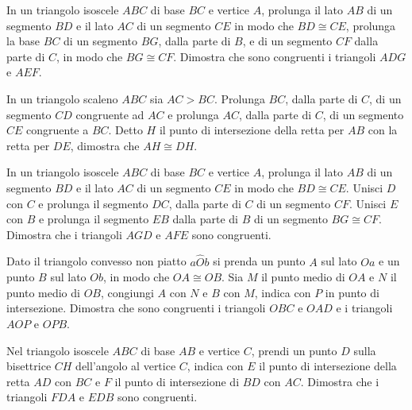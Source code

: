 \begin{multicols}{2}
\begin{esercizio}
\label{ese:2.65}
In un triangolo isoscele \(ABC\) di base \(BC\) e vertice \(A\), prolunga 
il lato \(AB\) di un segmento \(BD\) e il lato \(AC\) di un segmento \(CE\) 
in modo che \(BD\cong CE\), prolunga la base \(BC\) di un segmento \(BG\), 
dalla parte di \(B\), e di un segmento \(CF\) dalla parte di \(C\), in modo 
che \(BG\cong CF\). Dimostra che sono congruenti i triangoli \(ADG\) e 
\(AEF\).
\end{esercizio}

\begin{esercizio}
\label{ese:2.66}
In un triangolo scaleno \(ABC\) sia \(AC>BC\). Prolunga \(BC\), dalla parte 
di \(C\), di un segmento \(CD\) congruente ad \(AC\) e prolunga \(AC\), dalla 
parte di \(C\), di un segmento \(CE\) congruente a \(BC\). Detto \(H\) il 
punto di intersezione della retta per \(AB\) con la retta per \(DE\), 
dimostra che \(AH\cong DH\).
\end{esercizio}

\begin{esercizio}
\label{ese:2.67}
In un triangolo isoscele \(ABC\) di base \(BC\) e vertice \(A\), prolunga 
il lato \(AB\) di un segmento \(BD\) e il lato \(AC\) di un segmento \(CE\) 
in modo che \(BD\cong CE\). Unisci \(D\) con \(C\) e prolunga il segmento 
\(DC\), dalla parte di \(C\) di un segmento \(CF\). Unisci \(E\) con \(B\) e 
prolunga il segmento \(EB\) dalla parte di \(B\) di un segmento \(BG\cong 
CF\). Dimostra che i triangoli \(AGD\) e \(AFE\) sono congruenti.
\end{esercizio}

\begin{esercizio}
\label{ese:2.68}
Dato il triangolo convesso non piatto \(a\widehat{O}b\) si prenda un 
punto \(A\) sul lato \(Oa\) e un punto \(B\) sul lato \(Ob\), in modo che 
\(OA\cong OB\). Sia \(M\) il punto medio di \(OA\) e \(N\) il punto medio di 
\(OB\), congiungi \(A\) con \(N\) e \(B\) con \(M\), indica con \(P\) in punto di 
intersezione. Dimostra che sono congruenti i triangoli \(OBC\) e \(OAD\) 
e i triangoli \(AOP\) e \(OPB\).
\end{esercizio}

\begin{esercizio}
\label{ese:2.69}
Nel triangolo isoscele \(ABC\) di base \(AB\) e vertice \(C\), prendi un 
punto \(D\) sulla bisettrice \(CH\) dell'angolo al vertice \(C\), indica 
con \(E\) il punto di intersezione della retta \(AD\) con \(BC\) e \(F\) il 
punto di intersezione di \(BD\) con \(AC\). Dimostra che i triangoli \(FDA\) 
e \(EDB\) sono congruenti.
\end{esercizio}


\end{multicols}
